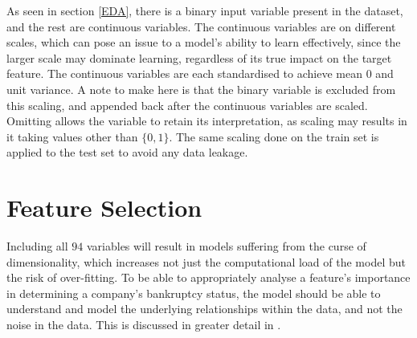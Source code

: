 \documentclass[11pt]{article}
\begin{document}
As seen in section \ref{EDA}, there is a binary input variable present in the dataset, and the rest are continuous variables. The continuous variables are on different scales, which can pose an issue to a model's ability to learn effectively, since the larger scale may dominate learning, regardless of its true impact on the target feature. The continuous variables are each standardised to achieve mean $0$ and unit variance. A note to make here is that the binary variable is excluded from this scaling, and appended back after the continuous variables are scaled. Omitting allows the variable to retain its interpretation, as scaling may results in it taking values other than $\{0,1\}$. The same scaling done on the train set is applied to the test set to avoid any data leakage.\\ 

\section{Feature Selection} \label{FeatureSelection}

Including all $94$ variables will result in models suffering from the curse of dimensionality, which increases not just the computational load of the model but the risk of over-fitting. To be able to appropriately analyse a feature's importance in determining a company's bankruptcy status, the model should be able to understand and model the underlying relationships within the data, and not the noise in the data. This is discussed in greater detail in  \cite{feature_selection_curse_of_dim}. \\
\end{document}
